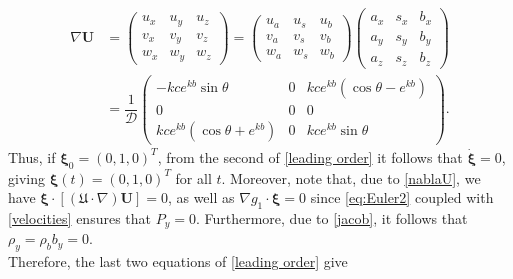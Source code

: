 \documentclass[reqno]{amsart}
\newcommand{\A}{\boldsymbol{\mathfrak{U}}}              %
\newcommand{\D}{\mathcal{D}}
\newcommand{\bu}{\mathbf{U}}             %
\begin{document}
\begin{equation}\label{nablaU}
\begin{aligned}
 \nabla \bu&=\begin{pmatrix}
	u_x & u_y & u_z\\
	v_x & v_y & v_z\\
	w_x & w_y & w_z
\end{pmatrix} = \begin{pmatrix}
	u_a & u_s & u_b\\
	v_a & v_s & v_b\\
	w_a & w_s & w_b
\end{pmatrix}  \begin{pmatrix}
	a_x & s_x & b_x \\
	a_y & s_y & b_y\\
	a_z& s_z & b_z		
\end{pmatrix}\\
&=\dfrac{1}{\D}\begin{pmatrix}
	 -kce^{kb}\sin\theta & 0& kce^{kb}(\cos\theta-e^{kb})\\
     0 &0&0\\
  kc e^{kb}(\cos\theta + e^{kb})& 0 & kc e^{kb}\sin\theta
\end{pmatrix}.
\end{aligned}
\end{equation}
Thus, if $\boldsymbol{\xi}_0=(0,1,0)^T$, from the second of \eqref{leading order} it follows that $\dot{\boldsymbol{\xi}}=0$, giving $\boldsymbol{\xi}(t)=(0,1,0)^T$ for all $t$. Moreover, note that, due to \eqref{nablaU}, we have $\boldsymbol{\xi}\cdot[(\A\cdot\nabla)\bu]=0$, as well as $\nabla g_1\cdot\boldsymbol{\xi}=0$ since \eqref{eq:Euler2} coupled with \eqref{velocities} ensures that $P_y=0$. Furthermore, due to \eqref{jacob}, it follows that $\rho_y=\rho_b b_y =0$.\\
Therefore, the last two equations of \eqref{leading order} give
\end{document}
